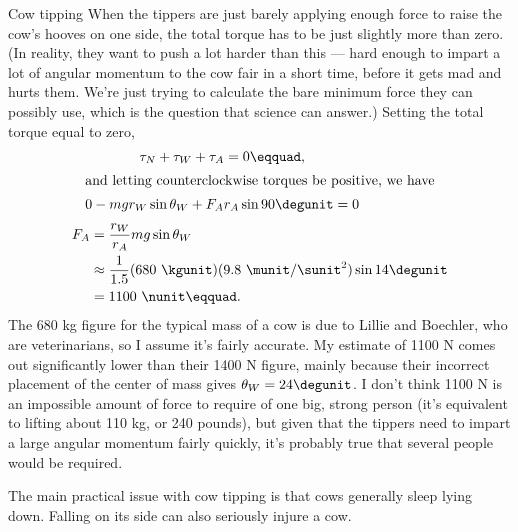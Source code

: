 \begin{eg}{Cow tipping}
When the tippers are just barely applying enough force to raise the cow's hooves
on one side, the total torque has to be
just slightly more than zero. (In reality, they want to push a lot harder than this ---
hard enough to impart a lot of angular momentum to the cow fair in a short time,
before it gets mad and hurts them. We're just trying to calculate the bare
minimum force they can possibly use, which is the question that science can answer.)
Setting the total torque equal to zero,
\begin{gather*}
  \tau_{N}+\tau_{W}+\tau_{A} = 0\eqquad, \\
\intertext{and letting counterclockwise torques be positive, we have}
  0-mgr_W\sin\theta_W+F_Ar_A\sin 90\degunit = 0 \\
\end{gather*}
\begin{align*}
  F_A &= \frac{r_W}{r_A} mg \sin\theta_W \\
      &\approx \frac{1}{1.5} (680\ \kgunit)(9.8\ \munit/\sunit^2) \sin 14\degunit \\
      &=1100\ \nunit\eqquad.
\end{align*}
The 680 kg figure for the typical mass of a cow is due to Lillie and Boechler, who
are veterinarians, so I assume it's fairly accurate. My estimate of 1100 N comes out
significantly lower than their 1400 N figure, mainly because their incorrect
placement of the center of mass gives $\theta_W=24\degunit$. I don't think 1100 N is an impossible amount of force
to require of one big, strong person (it's equivalent to lifting about 110 kg, or 240 pounds),
but given that the tippers need to impart a large angular momentum fairly quickly,
it's probably true that several people would be required.

The main practical issue with cow tipping is that cows generally sleep lying down.
Falling on its side can also seriously injure a cow.
\end{eg}

\pagebreak[4]

\startdqs

